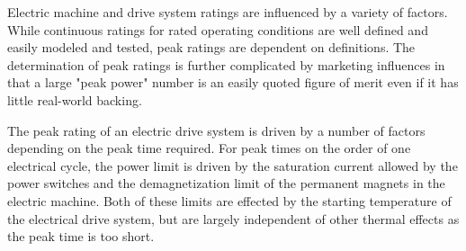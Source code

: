 Electric machine and drive system ratings are influenced by a variety of
factors.
While continuous ratings for rated operating conditions are well defined and
easily modeled and tested, peak ratings are dependent on definitions.
The determination of peak ratings is further complicated by marketing
influences in that a large "peak power" number is an easily quoted figure of
merit even if it has little real-world backing.

The peak rating of an electric drive system is driven by a number of factors
depending on the peak time required.
For peak times on the order of one electrical cycle, the power limit is driven
by the saturation current allowed by the power switches and the
demagnetization limit of the permanent magnets in the electric machine.
Both of these limits are effected by the starting temperature of the
electrical drive system, but are largely independent of other thermal effects
as the peak time is too short.


